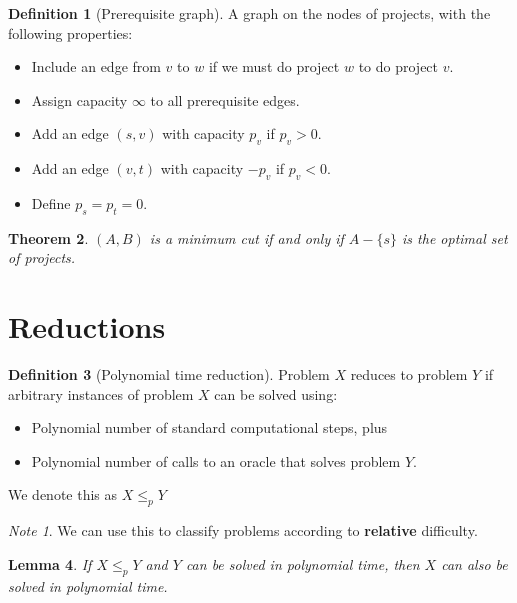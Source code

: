 \documentclass[10pt, oneside, reqno]{amsart}
\theoremstyle{plain}%
\newtheorem{thm}{Theorem}[section]
\newtheorem{lem}[thm]{Lemma}
\theoremstyle{definition}
\newtheorem{defn}[thm]{Definition}
\theoremstyle{remark}
\newtheorem*{note}{Note}
\begin{document}
\begin{defn}[Prerequisite graph]
    A graph on the nodes of projects, with the following properties:
\begin{itemize}
    \item Include an edge from $v$ to $w$ if we must do project $w$ to do project $v$.  
    \item Assign capacity $\infty$ to all prerequisite edges.
    \item Add an edge $(s,v)$ with capacity $p_v$ if $p_v > 0$.
    \item Add an edge $(v,t)$ with capacity $-p_v$ if $p_v < 0$.
    \item Define $p_s = p_t = 0$.  
\end{itemize}
\end{defn}

\begin{thm}
    $(A,B)$ is a minimum cut if and only if $A - \{s\}$ is the optimal set of projects.
\end{thm}






\section{Reductions} %
\label{sec:reductions}
\begin{defn}[Polynomial time reduction]
    Problem $X$ reduces to problem $Y$ if arbitrary instances of problem $X$ can be solved using:
    \begin{itemize}
        \item Polynomial number of standard computational steps, plus
        \item Polynomial number of calls to an oracle that solves problem $Y$.
    \end{itemize}
    
    We denote this as $X \leq_p Y$
\end{defn}

\begin{note}
    We can use this to classify problems according to \textbf{relative} difficulty.  
\end{note}

\begin{lem}
    If $X \leq_p Y$ and $Y$ can be solved in polynomial time, then $X$ can also be solved in polynomial time.
\end{lem}
\end{document}

